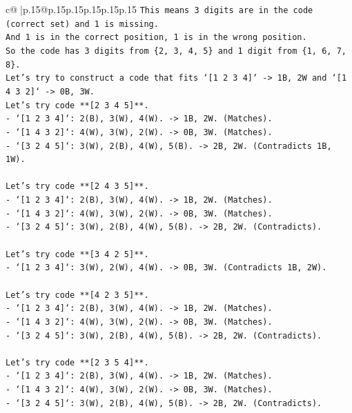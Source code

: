 \documentclass{article}
\begin{document}
{\begin{supertabular}{c@{$\;$}|p{.15\linewidth}@{}p{.15\linewidth}p{.15\linewidth}p{.15\linewidth}p{.15\linewidth}p{.15\linewidth}}
{{{\texttt{This means 3 digits are in the code (correct set) and 1 is missing.} \\
\texttt{And 1 is in the correct position, 1 is in the wrong position.} \\
\texttt{So the code has 3 digits from \{2, 3, 4, 5\} and 1 digit from \{1, 6, 7, 8\}.} \\
\texttt{Let's try to construct a code that fits `{[}1 2 3 4{]}` {-}> 1B, 2W and `{[}1 4 3 2{]}` {-}> 0B, 3W.} \\
\texttt{Let's try code **{[}2 3 4 5{]}**.} \\
\texttt{{-} `{[}1 2 3 4{]}`: 2(B), 3(W), 4(W). {-}> 1B, 2W. (Matches).} \\
\texttt{{-} `{[}1 4 3 2{]}`: 4(W), 3(W), 2(W). {-}> 0B, 3W. (Matches).} \\
\texttt{{-} `{[}3 2 4 5{]}`: 3(W), 2(B), 4(W), 5(B). {-}> 2B, 2W. (Contradicts 1B, 1W).} \\
\\ 
\texttt{Let's try code **{[}2 4 3 5{]}**.} \\
\texttt{{-} `{[}1 2 3 4{]}`: 2(B), 3(W), 4(W). {-}> 1B, 2W. (Matches).} \\
\texttt{{-} `{[}1 4 3 2{]}`: 4(W), 3(W), 2(W). {-}> 0B, 3W. (Matches).} \\
\texttt{{-} `{[}3 2 4 5{]}`: 3(W), 2(B), 4(W), 5(B). {-}> 2B, 2W. (Contradicts).} \\
\\ 
\texttt{Let's try code **{[}3 4 2 5{]}**.} \\
\texttt{{-} `{[}1 2 3 4{]}`: 3(W), 2(W), 4(W). {-}> 0B, 3W. (Contradicts 1B, 2W).} \\
\\ 
\texttt{Let's try code **{[}4 2 3 5{]}**.} \\
\texttt{{-} `{[}1 2 3 4{]}`: 2(B), 3(W), 4(W). {-}> 1B, 2W. (Matches).} \\
\texttt{{-} `{[}1 4 3 2{]}`: 4(W), 3(W), 2(W). {-}> 0B, 3W. (Matches).} \\
\texttt{{-} `{[}3 2 4 5{]}`: 3(W), 2(B), 4(W), 5(B). {-}> 2B, 2W. (Contradicts).} \\
\\ 
\texttt{Let's try code **{[}2 3 5 4{]}**.} \\
\texttt{{-} `{[}1 2 3 4{]}`: 2(B), 3(W), 4(W). {-}> 1B, 2W. (Matches).} \\
\texttt{{-} `{[}1 4 3 2{]}`: 4(W), 3(W), 2(W). {-}> 0B, 3W. (Matches).} \\
\texttt{{-} `{[}3 2 4 5{]}`: 3(W), 2(B), 4(W), 5(B). {-}> 2B, 2W. (Contradicts).} \\
}}}
\end{supertabular}}
\end{document}
